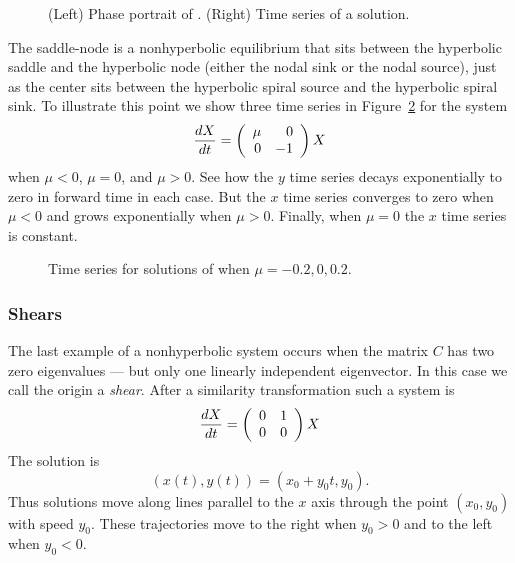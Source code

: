 \documentclass{ximera}
\begin{document}
\begin{figure}[htb]
     \centerline{%
     }
     \caption{(Left) Phase portrait of \protect{}.
	(Right) Time series of a solution.}
     \label{F:10ev}
\end{figure}

The saddle-node is a
nonhyperbolic equilibrium
that sits between
the hyperbolic saddle and the hyperbolic node (either the nodal
sink or the nodal source), just as the center sits
between the hyperbolic spiral source and the hyperbolic spiral sink.  To
illustrate this point we show three time series in
Figure~\ref{F:saddlenodebif} for the system
\begin{equation}  \label{e:saddlenodebif}
\frac{dX}{dt}  =  \left(\begin{array}{rr} \mu & 0\\ 0 &-1\end{array}\right)X
\end{equation}
when $\mu<0$, $\mu=0$, and $\mu>0$.  See how the $y$ time series
decays exponentially to zero in forward time in each case.  But
the $x$ time series converges to zero when $\mu<0$ and grows
exponentially when $\mu>0$.  Finally, when $\mu=0$ the $x$ time
series is constant.

\begin{figure}[htb]
     \centerline{%
     }
     \caption{Time series for solutions of \protect{}
	when $\mu=-0.2,0,0.2$.}
     \label{F:saddlenodebif}
\end{figure}


\subsubsection*{Shears}

The last example of a nonhyperbolic system occurs when the matrix $C$
has two zero eigenvalues --- but only one linearly independent
eigenvector.  In this case we call the origin a {\em shear\/}.  After a
similarity transformation such a system is
\begin{equation}  \label{e:00}
\frac{dX}{dt} = \left(\begin{array}{rr} 0 & 1\\ 0 &0\end{array}\right) X
\end{equation}
The solution is
\[
(x(t),y(t)) = (x_0+y_0t,y_0).
\]
Thus solutions move along lines parallel to the $x$ axis through
the point $(x_0,y_0)$ with speed $y_0$.  These trajectories move
to the right when $y_0>0$ and to the left when $y_0<0$.
\end{document}
